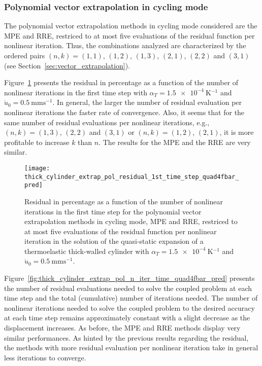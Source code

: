 \FloatBarrier

\subsubsection{Polynomial vector extrapolation in cycling mode}

The polynomial vector extrapolation methods in cycling mode considered are the MPE and RRE, restriced to at most five evaluations of the residual function per nonlinear iteration.
Thus, the combinations analyzed are characterized by the ordered pairs \((n,k)=(1,1)\), \((1,2)\), \((1,3)\), \((2,1)\), \((2,2)\) and \((3,1)\) (see Section~\ref{sec:vector_extrapolation}).

Figure~\ref{fig:thick_cylinder_extrap_pol_residual_1st_time_step_quad4fbar_pred} presents the residual in percentage as a function of the number of nonlinear iterations in the first time step with \(\alpha_T=\SI{1.5e-4}{\kelvin^{-1}}\) and \(\dot u_0 =\SI{0.5}{\milli\meter\second^{-1}}\).
In general, the larger the number of residual evaluation per nonlinear iterations the faster rate of convergence.
Also, it seems that for the same number of residual evaluations per nonlinear iterations, e.g., \((n,k)=(1,3)\), \((2,2)\) and \((3,1)\) or \((n,k)=(1,2)\), \((2,1)\), it is more profitable to increase \(k\) than \(n\).
The results for the MPE and the RRE are very similar.

\begin{figure}[htbp]
  \centering
  \texttt{[image: thick\_cylinder\_extrap\_pol\_residual\_1st\_time\_step\_quad4fbar\_pred]}
  \caption{Residual in percentage as a function of the number of nonlinear iterations in the first time step for the polynomial vector extrapolation methods in cycling mode, MPE and RRE, restriced to at most five evaluations of the residual function per nonlinear iteration in the solution of the quasi-static expansion of a thermoelastic thick-walled cylinder with \(\alpha_T=\SI{1.5e-4}{\kelvin^{-1}}\) and \(\dot u_0 =\SI{0.5}{\milli\meter\second^{-1}}\).}
\label{fig:thick_cylinder_extrap_pol_residual_1st_time_step_quad4fbar_pred}
\end{figure}

Figure~\ref{fig:thick_cylinder_extrap_pol_n_iter_time_quad4fbar_pred} presents the number of residual evaluations needed to solve the coupled problem at each time step and the total (cumulative) number of iterations needed.
The number of nonlinear iterations needed to solve the coupled problem to the desired accuracy at each time step remains approximately constant with a slight decrease as the displacement increases.
As before, the MPE and RRE methods display very similar performances.
As hinted by the previous results regarding the residual, the methods with more residual evaluation per nonlinear iteration take in general less iterations to converge.

